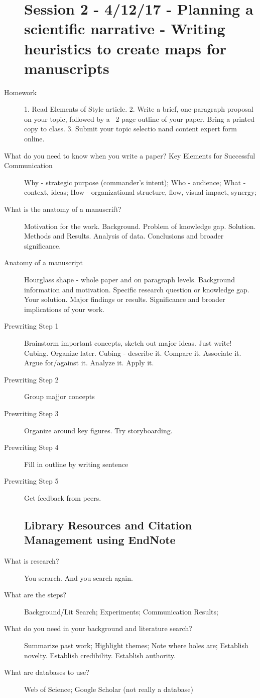 \documentclass[10pt]{article}
\begin{document}
\begin{description}
\section{Session 2 - 4/12/17 - Planning a scientific narrative - Writing heuristics to create maps for manuscripts}
\item[Homework]
  1. Read Elements of Style article.
  2. Write a brief, one-paragraph proposal on your topic, followed by a ~2 page outline of your paper. Bring a printed copy to class.
  3. Submit your topic selectio nand content expert form online.
\item[What do you need to know when you write a paper? Key Elements for Successful Communication]
  Why - strategic purpose (commander's intent);
  Who - audience;
  What - context, ideas;
  How - organizational structure, flow, visual impact, synergy;
\item[What is the anatomy of a manuscrift?]
  Motivation for the work. Background.
  Problem of knowledge gap. Solution. Methods and Results.
  Analysis of data. Conclusions and broader significance.
\item[Anatomy of a manuscript]
  Hourglass shape - whole paper and on paragraph levels.
  Background information and motivation.
  Specific research question or knowledge gap.
  Your solution.
  Major findings or results.
  Significance and broader implications of your work.
\item[Prewriting Step 1]
  Brainstorm important concepts, sketch out major ideas.
  Just write! Cubing. Organize later.
  Cubing - describe it. Compare it. Associate it. Argue for/against it. Analyze it. Apply it.
\item[Prewriting Step 2]
  Group majjor concepts
\item[Prewriting Step 3]
  Organize around key figures. Try storyboarding.
\item[Prewriting Step 4]
  Fill in outline by writing sentence
\item[Prewriting Step 5]
  Get feedback from peers.
\subsection{Library Resources and Citation Management using EndNote}
\item[What is research?]
  You serarch. And you search again.
\item[What are the steps?]
  Background/Lit Search;
  Experiments;
  Communication Results;
\item[What do you need in your background and literature search?]
  Summarize past work;
  Highlight themes;
  Note where holes are;
  Establish novelty. Establish credibility. Establish authority.
\item[What are databases to use?]
  Web of Science; Google Scholar (not really a database)
\end{description}
\end{document}

